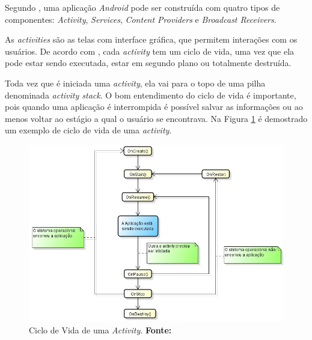 	\par Segundo , uma aplicação \textit{Android} pode ser
construída com quatro tipos de componentes: \textit{Activity},
\textit{Services}, \textit{Content Providers} e \textit{Broadcast Receivers}.

	\par As \textit{activities} são as telas com interface gráfica, que permitem
interações com os usuários. De acordo com , cada
\textit{activity} tem um ciclo de vida, uma vez que ela pode estar sendo
executada, estar em segundo plano ou totalmente destruída.

	\par Toda vez que é iniciada uma \textit{activity}, ela vai para o topo de uma
pilha denominada \textit{activity stack}. O bom entendimento do ciclo de vida é
importante, pois quando uma aplicação é interrompida é possível salvar as
informações ou ao menos voltar ao estágio a qual o usuário se encontrava. Na
Figura \ref{fig:qt1} é demostrado um exemplo de ciclo de vida de uma
\textit{activity}.

\begin{figure}[h!]
	\centerline{\includegraphics[scale=0.5]{./imagens/1_q_teorico/qt1.png}}
	\caption[Ciclo de Vida de uma \textit{Activity} ]{Ciclo de Vida de uma
	\textit{Activity}.
	 \textbf{Fonte:}}
	\label{fig:qt1}
\end{figure}

